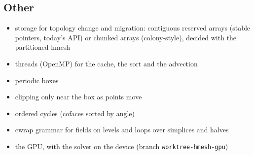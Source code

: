 \documentclass[10pt,a4paper]{article}
\theoremstyle{definition}
\newcommand{\fn}[1]{\texttt{#1}}
\begin{document}
\subsection*{Other}
\begin{itemize}
  \item storage for topology change and migration: contiguous reserved
    arrays (stable pointers, today's API) or chunked arrays (colony-style),
    decided with the partitioned hmesh
  \item threads (OpenMP) for the cache, the sort and the advection
  \item periodic boxes
  \item clipping only near the box as points move
  \item ordered cycles (cofaces sorted by angle)
  \item cwrap grammar for fields on levels and loops over simplices and
    halves
  \item the GPU, with the solver on the device (branch
    \fn{worktree-hmesh-gpu})
\end{itemize}
\end{document}
